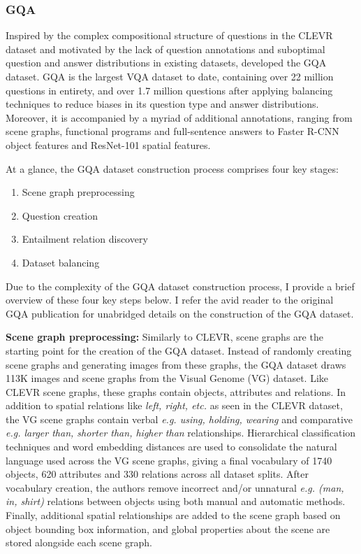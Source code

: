 \subsubsection{GQA}
Inspired by the complex compositional structure of questions in the CLEVR dataset and motivated by the lack of question annotations and suboptimal question and answer distributions in existing datasets, \citeauthor{hudson2019gqa} developed the GQA dataset. GQA is the largest VQA dataset to date, containing over 22 million questions in entirety, and over 1.7 million questions after applying balancing techniques to reduce biases in its question type and answer distributions. Moreover, it is accompanied by a myriad of additional annotations, ranging from scene graphs, functional programs and full-sentence answers to Faster R-CNN object features and ResNet-101 spatial features.

At a glance, the GQA dataset construction process comprises four key stages:

\begin{enumerate}
    \item Scene graph preprocessing
    \item Question creation
    \item Entailment relation discovery
    \item Dataset balancing
\end{enumerate}

Due to the complexity of the GQA dataset construction process, I provide a brief overview of these four key steps below. I refer the avid reader to the original GQA publication \cite{hudson2019gqa} for unabridged details on the construction of the GQA dataset.

\textbf{Scene graph preprocessing:} Similarly to CLEVR, scene graphs are the starting point for the creation of the GQA dataset. Instead of randomly creating scene graphs and generating images from these graphs, the GQA dataset draws 113K images and scene graphs from the Visual Genome (VG) dataset. Like CLEVR scene graphs, these graphs contain objects, attributes and relations. In addition to spatial relations like \textit{left, right, etc.} as seen in the CLEVR dataset, the VG scene graphs contain verbal \textit{e.g. using, holding, wearing} and comparative \textit{e.g. larger than, shorter than, higher than} relationships. Hierarchical classification techniques and word embedding distances are used to consolidate the natural language used across the VG scene graphs, giving a final vocabulary of 1740 objects, 620 attributes and 330 relations across all dataset splits. After vocabulary creation, the authors remove incorrect and/or unnatural \textit{e.g. (man, in, shirt)} relations between objects using both manual and automatic methods. Finally, additional spatial relationships are added to the scene graph based on object bounding box information, and global properties about the scene are stored alongside each scene graph.

